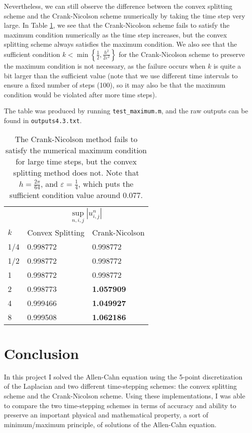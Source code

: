 \documentclass{article}
\begin{document}
	Nevertheless, we can still observe the difference between the convex splitting scheme and the Crank-Nicolson scheme numerically by taking the time step very large. In Table \ref{table:max}, we see that the Crank-Nicolson scheme fails to satisfy the maximum condition numerically as the time step increases, but the convex splitting scheme always satisfies the maximum condition. We also see that the sufficient condition $k < \min\left\{\frac{1}{2}, \frac{h^2}{2\varepsilon^2}\right\}$ for the Crank-Nicolson scheme to preserve the maximum condition is not necessary, as the failure occurs when $k$ is quite a bit larger than the sufficient value (note that we use different time intervals to ensure a fixed number of steps (100), so it may also be that the maximum condition would be violated after more time steps).
	
	The table was produced by running \verb*|test_maximum.m|, and the raw outputs can be found in \verb*|outputs4.3.txt|.
	
	\begin{table}[h]
		\centering
		\begin{tabular}{@{}lll@{}}
			\toprule
			& \multicolumn{2}{c}{$\sup\limits_{n,i,j} |u^n_{i,j}|$}\\
			\cmidrule{2-3}
			$k$ & Convex Splitting & Crank-Nicolson \\
			\midrule
			1/4&	0.998772&	0.998772\\
			1/2	&0.998772&	0.998772 \\
			1	&0.998772&	0.998772\\
			2	&0.998773&	\bf1.057909\\
			4	&0.999466&	\bf1.049927\\
			8	&0.999508&	\bf1.062186\\
			\bottomrule
		\end{tabular}
		\caption{The Crank-Nicolson method fails to satisfy the numerical maximum condition for large time steps, but the convex splitting method does not. Note that $h=\frac{2\pi}{64}$, and $\varepsilon = \frac{1}{4}$, which puts the sufficient condition value around 0.077.}
		\label{table:max}
	\end{table}
	
	\section{Conclusion}
	
	In this project I solved the Allen-Cahn equation using the 5-point discretization of the Laplacian and two different time-stepping schemes: the convex splitting scheme and the Crank-Nicolson scheme. Using these implementations, I was able to compare the two time-stepping schemes in terms of accuracy and ability to preserve an important physical and mathematical property, a sort of minimum/maximum principle, of solutions of the Allen-Cahn equation.
	
\end{document}
